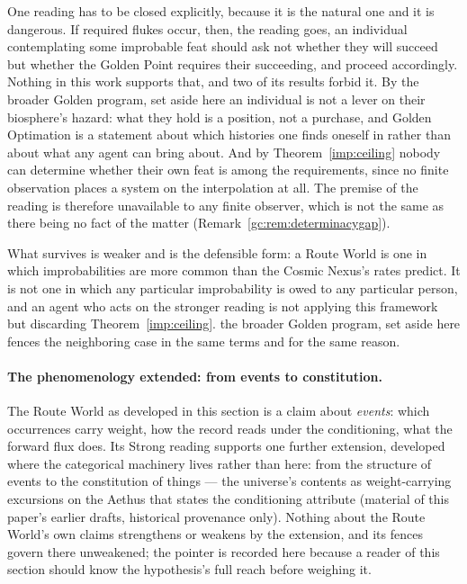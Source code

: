 \begin{remark}
\label{gc:rem:routefence}
One reading has to be closed explicitly, because it is the natural one
and it is dangerous. If required flukes occur, then, the reading goes, an individual
contemplating some improbable feat should ask not whether they will
succeed but whether the Golden Point requires their succeeding, and
proceed accordingly. Nothing in this work supports that, and two of its
results forbid it. By the broader Golden program, set aside here an individual is not a
lever on their biosphere's hazard: what they hold is a position, not a
purchase, and Golden Optimation is a statement about which histories one
finds oneself in rather than about what any agent can bring about. And
by Theorem~\ref{imp:ceiling} nobody can determine whether their own
feat is among the requirements, since no finite observation places a
system on the interpolation at all. The premise of the reading is therefore
unavailable to any finite observer, which is not the same as there being
no fact of the matter (Remark~\ref{gc:rem:determinacygap}).

What survives is weaker and is the defensible form: a Route World is one in
which improbabilities are more common than the Cosmic Nexus's rates
predict. It is not one in which any particular improbability is owed to
any particular person, and an agent who acts on the stronger reading is
not applying this framework but discarding
Theorem~\ref{imp:ceiling}. the broader Golden program, set aside here fences the neighboring
case in the same terms and for the same reason.
\end{remark}

\paragraph{The phenomenology extended: from events to constitution.}\label{gc:rem:constitution}
The Route World as developed in this section is a claim about
\emph{events}: which occurrences carry weight, how the record reads
under the conditioning, what the forward flux does. Its Strong reading
supports one further extension, developed where the categorical
machinery lives rather than here: from the structure of events to the
constitution of things --- the universe's contents as
weight-carrying excursions on the Aethus that states the conditioning
attribute (material of this paper's earlier drafts, historical provenance only). Nothing about the Route
World's own claims strengthens or weakens by the extension, and its
fences govern there unweakened; the pointer is recorded here because a
reader of this section should know the hypothesis's full reach before
weighing it.

